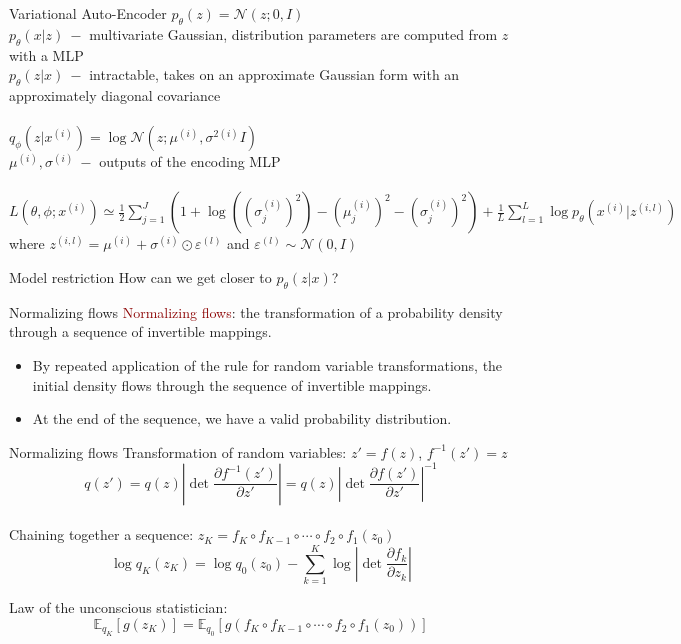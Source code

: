 \documentclass[unicode,11pt]{beamer}
\begin{document}
\begin{frame}[fragile]{Variational Auto-Encoder}
  $p_{\theta}(z) = \mathcal{N}(z;0, I)$\\
  $p_{\theta}(x|z) ~-$ multivariate Gaussian, distribution parameters are computed from
  $z$ with a MLP\\
  $p_{\theta}(z|x) ~-$ intractable, takes on an approximate Gaussian form with an approximately diagonal covariance\\
  ~\\
  $q_{\phi}(z|x^{(i)}) = \log \mathcal{N}(z; \mu^{(i)}, \sigma^{2(i)} I) $\\
  $\mu^{(i)}, \sigma^{(i)} ~-$ outputs of the encoding MLP\\
  ~\\
  $L(\theta, \phi; x^{(i)}) \simeq \frac{1}{2} \sum\limits_{j=1}^J (1 + \log ((\sigma_j^{(i)})^2) -
  (\mu_j^{(i)})^2 - (\sigma_j^{(i)})^2) + \frac{1}{L} \sum\limits_{l=1}^L \log p_{\theta} (x^{(i)}|z^{(i,l)})$\\
  where $z^{(i,l)} = \mu^{(i)} + \sigma^{(i)} \odot \varepsilon^{(l)}$ and $\varepsilon^{(l)} \sim \mathcal{N}(0,I)$
\end{frame}

\begin{frame}[fragile]{Model restriction}
  How can we get closer to $p_{\theta}(z|x)$?
\end{frame}

\begin{frame}[fragile]{Normalizing flows}
  \textcolor{darkred}{Normalizing flows}: the transformation of a probability density through
  a sequence of invertible mappings.
  \begin{itemize}
    \item By repeated application of the rule for random variable transformations, the initial
    density flows through the sequence of invertible mappings.
    \item At the end of the sequence, we have a valid probability distribution.
  \end{itemize}

\end{frame}

\begin{frame}[fragile]{Normalizing flows}
  Transformation of random variables: $z' = f(z)$, $f^{-1}(z') = z$\\
  $$q(z') = q(z) \left\vert \det \frac{\partial f^{-1}(z')}{\partial z'} \right\vert =
  q(z) \left\vert \det \frac{\partial f(z')}{\partial z'} \right\vert^{-1}$$\\
  Chaining together a sequence: $z_K = f_K \circ f_{K−1} \circ \cdots \circ f_2 \circ f_1(z_0)$\\
  $$\log q_K(z_K) = \log q_0(z_0) − \sum_{k=1}^K \log \left\vert \det \frac{\partial f_k}{\partial z_k} \right\vert $$

  Law of the unconscious statistician:\\
  $$\mathbb{E}_{q_K} \left[g(z_K)\right] = \mathbb{E}_{q_0} \left[ g(f_K \circ f_{K−1} \circ \cdots \circ f_2
  \circ f_1(z_0)) \right] $$
\end{frame}
\end{document}
